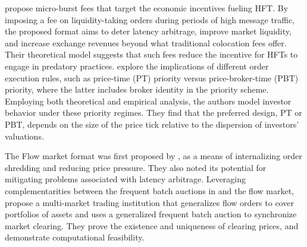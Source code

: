 \documentclass[12pt]{article}
\begin{document}
\cite{brolley2023} propose micro-burst fees that target the economic incentives fueling HFT. By imposing a fee on liquidity-taking orders during periods of high message traffic, the proposed format aims to deter latency arbitrage, improve market liquidity, and increase exchange revenues beyond what traditional colocation fees offer. Their theoretical model suggests that such fees reduce the incentive for HFTs to engage in predatory practices. 
\cite{Degryse2022} explore the implications of different order execution rules, such as price-time (PT) priority versus price-broker-time (PBT) priority, where the latter includes broker identity in the priority scheme. Employing both theoretical and empirical analysis, the authors model investor behavior under these priority regimes. They find that the preferred design, PT or PBT, depends on the size of the price tick relative to the dispersion of investors' valuations. 

The Flow market format was first proposed by  \cite{Kyle2017}, as a means of internalizing order shredding and reducing price pressure. They also noted its potential for mitigating problems associated with latency arbitrage.
Leveraging complementarities between the frequent batch auctions in 
\cite{Budish2015} and the \cite{Kyle2017} flow market, \cite{Budish2023} 
propose a multi-market trading institution that generalizes flow orders to cover portfolios of assets and uses a generalized frequent batch auction to synchronize market clearing.  
They prove the existence and uniqueness of clearing prices, and demonstrate computational feasibility.
\end{document}
